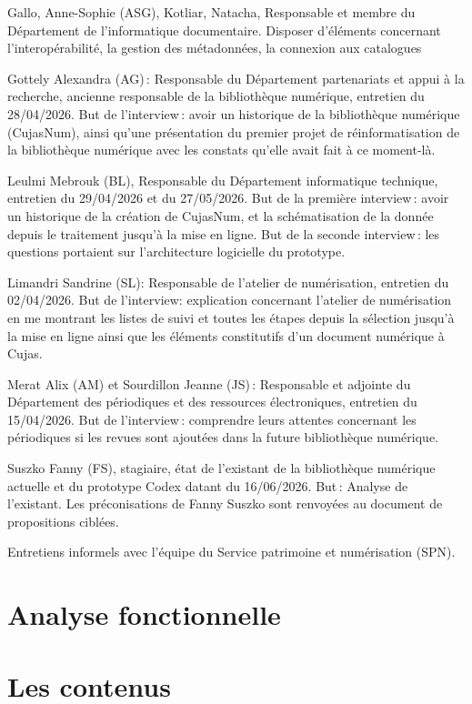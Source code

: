 Gallo, Anne-Sophie (ASG), Kotliar, Natacha, Responsable et membre du Département de l’informatique documentaire. Disposer d’éléments concernant l’interopérabilité, la gestion des métadonnées, la connexion aux catalogues 

Gottely Alexandra (AG) : Responsable du Département partenariats et appui à la recherche, ancienne responsable de la bibliothèque numérique, entretien du 28/04/2026. But de l’interview : avoir un historique de la bibliothèque numérique (CujasNum), ainsi qu’une présentation du premier projet de réinformatisation de la bibliothèque numérique avec les constats qu’elle avait fait à ce moment-là. 

Leulmi Mebrouk (BL), Responsable du Département informatique technique, entretien du 29/04/2026 et du 27/05/2026. But de la première interview : avoir un historique de la création de CujasNum, et la schématisation de la donnée depuis le traitement jusqu’à la mise en ligne. But de la seconde interview : les questions portaient sur l’architecture logicielle du prototype. 

Limandri Sandrine (SL): Responsable de l’atelier de numérisation, entretien du 02/04/2026. But de l’interview: explication concernant l’atelier de numérisation en me montrant les listes de suivi et toutes les étapes depuis la sélection jusqu’à la mise en ligne ainsi que les éléments constitutifs d’un document numérique à Cujas. 

Merat Alix (AM) et Sourdillon Jeanne (JS) : Responsable et adjointe du Département des périodiques et des ressources électroniques, entretien du 15/04/2026. But de l’interview : comprendre leurs attentes concernant les périodiques si les revues sont ajoutées dans la future bibliothèque numérique. 

Suszko Fanny (FS), stagiaire, état de l’existant de la bibliothèque numérique actuelle et du prototype Codex datant du 16/06/2026. But : Analyse de l’existant. Les préconisations de Fanny Suszko sont renvoyées au document de propositions ciblées.  

Entretiens informels avec l’équipe du Service patrimoine et numérisation (SPN).  

\section*{Analyse fonctionnelle} 

\section{Les contenus} 

